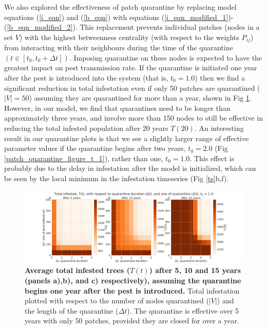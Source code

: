 We also explored the effectiveness of patch quarantine by replacing model equations (\ref{i_eqn}) and (\ref{b_eqn}) with equations (\ref{i_eqn_modified_1})-(\ref{b_eqn_modified_2}). This replacement prevents individual patches (nodes in a set $V$) with the highest betweenness centrality (with respect to the weights $P_{ij}$) from interacting with their neighbours during the time of the quarantine $(t \in [t_0, t_0 + \Delta t])$. Imposing quarantine on these nodes is expected to have the greatest impact on pest transmission rate. If the quarantine is initiated one year after the pest is introduced into the system (that is, $t_0 = 1.0$) then we find a significant reduction in total infestation even if only 50 patches are quarantined ($|V| = 50$) assuming they are quarantined for more than a year, shown in Fig \ref{patch_quarantine_figure_t_0}. However, in our model, we find that quarantines need to be longer than approximately three years, and involve more than 150 nodes to still be effective in reducing the total infested population after 20 years $T(20)$. An interesting result in our quarantine plots is that we see a slightly larger range of effective parameter values if the quarantine begins after two years, $t_0 = 2.0$ (Fig \ref{patch_quarantine_figure_t_1}), rather than one, $t_0 = 1.0$. This effect is probably due to the delay in infestation after the model is initialized, which can be seen by the local minimum in the infestation timeseries (Fig \ref{ts}b,f). 


\begin{figure}[!h]
    \centering
    \includegraphics[width =\textwidth]{chapter_2/node_quarantine_plot_1.0.png}
    \caption{\textbf{Average total infested trees ($T(t)$) after 5, 10 and 15 years (panels a),b), and c) respectively), assuming the quarantine begins one year after the pest is introduced.} Total infestation plotted with respect to the number of nodes quarantined ($|V|$) and the length of the quarantine ($\Delta t$). The quarantine is effective over 5 years with only 50 patches, provided they are closed for over a year.}
    \label{patch_quarantine_figure_t_0}
\end{figure}


